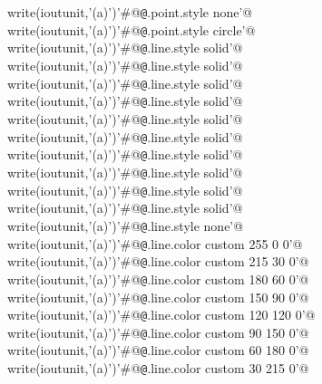 \documentclass[10pt,a4paper,notitlepage]{article}
\begin{document}
\begin{flushleft}
\begin{list}{}{}
\mbox{}\verb@      write(ioutunit,'(a)')'#@{\tt @}\verb@set[9].point.style none'@\\
\mbox{}\verb@      write(ioutunit,'(a)')'#@{\tt @}\verb@set[10].point.style circle'@\\
\mbox{}\verb@      write(ioutunit,'(a)')'#@{\tt @}\verb@set[0].line.style solid'@\\
\mbox{}\verb@      write(ioutunit,'(a)')'#@{\tt @}\verb@set[1].line.style solid'@\\
\mbox{}\verb@      write(ioutunit,'(a)')'#@{\tt @}\verb@set[2].line.style solid'@\\
\mbox{}\verb@      write(ioutunit,'(a)')'#@{\tt @}\verb@set[3].line.style solid'@\\
\mbox{}\verb@      write(ioutunit,'(a)')'#@{\tt @}\verb@set[4].line.style solid'@\\
\mbox{}\verb@      write(ioutunit,'(a)')'#@{\tt @}\verb@set[5].line.style solid'@\\
\mbox{}\verb@      write(ioutunit,'(a)')'#@{\tt @}\verb@set[6].line.style solid'@\\
\mbox{}\verb@      write(ioutunit,'(a)')'#@{\tt @}\verb@set[7].line.style solid'@\\
\mbox{}\verb@      write(ioutunit,'(a)')'#@{\tt @}\verb@set[8].line.style solid'@\\
\mbox{}\verb@      write(ioutunit,'(a)')'#@{\tt @}\verb@set[9].line.style solid'@\\
\mbox{}\verb@      write(ioutunit,'(a)')'#@{\tt @}\verb@set[10].line.style none'@\\
\mbox{}\verb@      write(ioutunit,'(a)')'#@{\tt @}\verb@set[0].line.color custom 255 0   0'@\\
\mbox{}\verb@      write(ioutunit,'(a)')'#@{\tt @}\verb@set[1].line.color custom 215 30  0'@\\
\mbox{}\verb@      write(ioutunit,'(a)')'#@{\tt @}\verb@set[2].line.color custom 180 60  0'@\\
\mbox{}\verb@      write(ioutunit,'(a)')'#@{\tt @}\verb@set[3].line.color custom 150 90  0'@\\
\mbox{}\verb@      write(ioutunit,'(a)')'#@{\tt @}\verb@set[4].line.color custom 120 120 0'@\\
\mbox{}\verb@      write(ioutunit,'(a)')'#@{\tt @}\verb@set[5].line.color custom 90  150 0'@\\
\mbox{}\verb@      write(ioutunit,'(a)')'#@{\tt @}\verb@set[6].line.color custom 60  180 0'@\\
\mbox{}\verb@      write(ioutunit,'(a)')'#@{\tt @}\verb@set[7].line.color custom 30  215 0'@\\

\end{list}
\end{flushleft}
\end{document}
